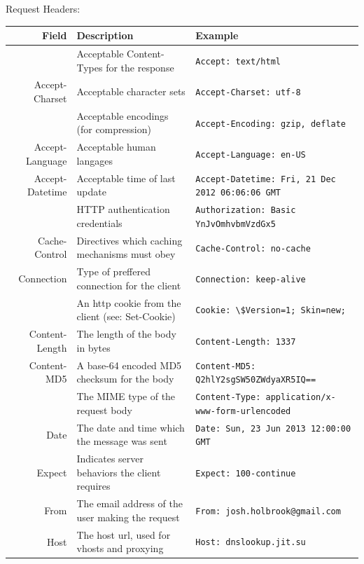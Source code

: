 \documentclass[final]{beamer}
\newcommand{\header}[1]{\texttt{\lstinline!#1!}}
\begin{document}
\begin{frame}{}
\begin{columns}
\begin{column}{0.4\textwidth}
\begin{block}{\huge{Request Headers:}}
          \footnotesize
          \begin{tabular}{r p{} p{}}
            Field & Description & Example \\ \hline
            \color{BigBlue}{Accept} & Acceptable Content-Types for the response & \header{Accept: text/html } \\
            Accept-Charset & Acceptable character sets & \header{Accept-Charset: utf-8 } \\
            \color{BigBlue}{Accept-Encoding} & Acceptable encodings (for compression) & \header{Accept-Encoding: gzip, deflate } \\
            Accept-Language & Acceptable human langages & \header{Accept-Language: en-US } \\
            Accept-Datetime & Acceptable time of last update & \header{Accept-Datetime: Fri, 21 Dec 2012 06:06:06 GMT } \\
            \color{BigBlue}{Authorization} & HTTP authentication credentials & \header{Authorization: Basic YnJvOmhvbmVzdGx5 } \\
            Cache-Control & Directives which caching mechanisms must obey & \header{Cache-Control: no-cache } \\
            Connection & Type of preffered connection for the client & \header{Connection: keep-alive } \\
            \color{BigBlue}{Cookie} & An http cookie from the client (see: Set-Cookie) & \header{Cookie: \$Version=1; Skin=new; } \\
            Content-Length & The length of the body in bytes & \header{Content-Length: 1337 } \\
            Content-MD5 & A base-64 encoded MD5 checksum for the body & \header{Content-MD5: Q2hlY2sgSW50ZWdyaXR5IQ== } \\
            \color{BigBlue}{Content-Type} & The MIME type of the request body & \header{Content-Type: application/x-www-form-urlencoded } \\
            Date & The date and time which the message was sent & \header{Date: Sun, 23 Jun 2013 12:00:00 GMT } \\
            Expect & Indicates server behaviors the client requires & \header{Expect: 100-continue } \\
            From & The email address of the user making the request & \header{From: josh.holbrook@gmail.com } \\
            Host & The host url, used for vhosts and proxying & \header{Host: dnslookup.jit.su } \\

\end{tabular}
\end{block}
\end{column}
\end{columns}
\end{frame}
\end{document}
